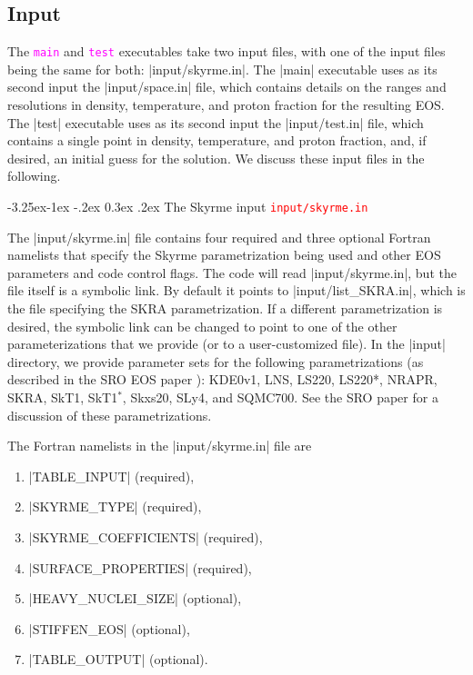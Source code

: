 \documentclass[letterpaper,11pt]{refart}
\makeatletter
\renewcommand\subsubsection{\@startsection{subsubsection}{3}{\z@}%
                           {-3.25ex\@plus -1ex \@minus -.2ex}%
                           {0.3ex \@plus .2ex}%
                           {\normalfont\normalsize\bf\fontsize{11}{13}\selectfont}}
\makeatother
\begin{document}
\subsection{Input}\label{ssec:SNA_in}

The \texttt{\textcolor{magenta}{main}} and
\texttt{\textcolor{magenta}{test}} executables take two input files,
with one of the input files being the same for both:
\verbfile|input/skyrme.in|.  The \verbexec|main| executable uses as its 
second input the \verbfile|input/space.in|
file, which contains details on the ranges and resolutions in density,
temperature, and proton fraction for the resulting EOS. The
\verbexec|test| executable uses as its second input the
\verbfile|input/test.in| file, which contains a single point in
density, temperature, and proton fraction, and, if desired, an initial
guess for the solution.  We discuss these input files in the
following.




\subsubsection{The Skyrme input \textcolor{red}{\texttt{input/skyrme.in}}}
\label{sssec:skyrme.in}

\sloppy The \verbfile|input/skyrme.in| file contains four required and
three optional Fortran namelists that specify the Skyrme
parametrization being used and other EOS parameters and code control
flags.  The code will read \verbfile|input/skyrme.in|, but the file
itself is a symbolic link.  By default it points to
\verbfile|input/list_SKRA.in|, which is the file specifying the SKRA
parametrization.  If a different parametrization is desired, the
symbolic link can be changed to point to one of the other
parameterizations that we provide (or to a user-customized file).  In
the \verbfile|input| directory, we provide parameter sets for the
following parametrizations (as described in the SRO EOS paper
\cite{schneider:17}): KDE0v1, LNS, LS220, LS220*, NRAPR, SKRA, SkT1,
SkT1$^*$, Skxs20, SLy4, and SQMC700. See the SRO paper
\cite{schneider:17} for a discussion of these parametrizations.

The Fortran namelists in the \verbfile|input/skyrme.in| file are
\begin{enumerate}
 \item \verbnml|TABLE_INPUT| (required),
 \item \verbnml|SKYRME_TYPE| (required),
 \item \verbnml|SKYRME_COEFFICIENTS| (required),
 \item \verbnml|SURFACE_PROPERTIES| (required),
 \item \verbnml|HEAVY_NUCLEI_SIZE| (optional), 
 \item \verbnml|STIFFEN_EOS| (optional),
 \item \verbnml|TABLE_OUTPUT| (optional).
\end{enumerate}
\end{document}

